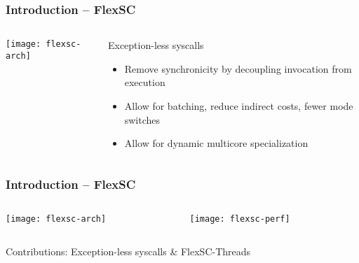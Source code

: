 \begin{frame}[plain]
	\frametitle{Introduction -- FlexSC}
	
	
	\begin{columns}
		
		\begin{column}{.4\textwidth}	
			
			\texttt{[image: flexsc-arch]}
			
		\end{column}
		
		\begin{column}{.6\textwidth}
			
			Exception-less syscalls
			\begin{itemize}
				\item  Remove synchronicity
				by decoupling invocation from execution
				
				
				\item Allow for batching, reduce indirect costs, fewer mode switches
				
				
				
				\item Allow for dynamic multicore specialization
				
				
				
			\end{itemize}
			
		\end{column}
		
	\end{columns}
	
	
\end{frame}	


\begin{frame}[plain]
	\frametitle{Introduction -- FlexSC}
	
	
	\begin{columns}
		
		\begin{column}{.4\textwidth}	
			
			\texttt{[image: flexsc-arch]}
			
		\end{column}
		
		\begin{column}{.6\textwidth}
			\texttt{[image: flexsc-perf]}


			
		\end{column}
		
	\end{columns}

			\LARGE Contributions: Exception-less syscalls  \& FlexSC-Threads	
	
\end{frame}	


